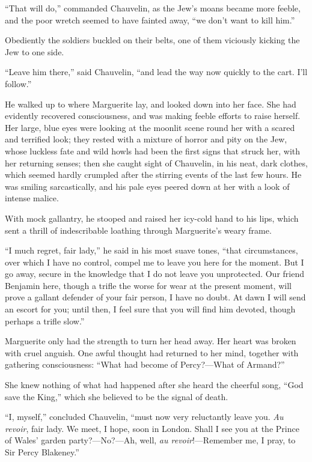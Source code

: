 \documentclass[paper=5.5in:8.5in,BCOR=7mm,twoside,DIV=calc,12pt,usegeometry,chapterprefix,endperiod,headings=big]{scrbook}
\begin{document}
\enquote{That will do,} commanded Chauvelin, as the Jew's moans became more feeble, and the poor wretch seemed to have fainted away, \enquote{we don't want to kill him.}

Obediently the soldiers buckled on their belts, one of them viciously kicking the Jew to one side.

\enquote{Leave him there,} said Chauvelin, \enquote{and lead the way now quickly to the cart. I'll follow.}

He walked up to where Marguerite lay, and looked down into her face. She had evidently recovered consciousness, and was making feeble efforts to raise herself. Her large, blue eyes were looking at the moonlit scene round her with a scared and terrified look; they rested with a mixture of horror and pity on the Jew, whose luckless fate and wild howls had been the first signs that struck her, with her returning senses; then she caught sight of Chauvelin, in his neat, dark clothes, which seemed hardly crumpled after the stirring events of the last few hours. He was smiling sarcastically, and his pale eyes peered down at her with a look of intense malice.

With mock gallantry, he stooped and raised her icy-cold hand to his lips, which sent a thrill of indescribable loathing through Marguerite's weary frame.

\enquote{I much regret, fair lady,} he said in his most suave tones, \enquote{that circumstances, over which I have no control, compel me to leave you here for the moment. But I go away, secure in the knowledge that I do not leave you unprotected. Our friend Benjamin here, though a trifle the worse for wear at the present moment, will prove a gallant defender of your fair person, I have no doubt. At dawn I will send an escort for you; until then, I feel sure that you will find him devoted, though perhaps a trifle slow.}

Marguerite only had the strength to turn her head away. Her heart was broken with cruel anguish. One awful thought had returned to her mind, together with gathering consciousness: \enquote{What had become of Percy?---What of Armand?}

She knew nothing of what had happened after she heard the cheerful song, \enquote{God save the King,} which she believed to be the signal of death.

\enquote{I, myself,} concluded Chauvelin, \enquote{must now very reluctantly leave you. \textit{Au revoir}, fair lady. We meet, I hope, soon in London. Shall I see you at the Prince of Wales’ garden party?---No?---Ah, well, \textit{au revoir}!---Remember me, I pray, to Sir Percy Blakeney.}
\end{document}
